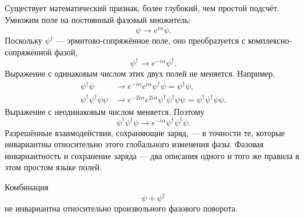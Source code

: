 Существует математический признак, более глубокий, чем простой подсчёт. Умножим поле на постоянный фазовый множитель:
\begin{equation}
\psi\longrightarrow e^{i\alpha}\psi.
\end{equation}
Поскольку \(\psi^\dagger\) — эрмитово-сопряжённое поле, оно преобразуется с комплексно-сопряжённой фазой,
\begin{equation}
\psi^\dagger\longrightarrow e^{-i\alpha}\psi^\dagger.
\end{equation}
Выражение с одинаковым числом этих двух полей не меняется. Например,
\begin{align}
\psi^\dagger\psi
&\longrightarrow
e^{-i\alpha}e^{i\alpha}\psi^\dagger\psi
=\psi^\dagger\psi,\\
\psi^\dagger\psi^\dagger\psi\psi
&\longrightarrow
e^{-2i\alpha}e^{2i\alpha}
\psi^\dagger\psi^\dagger\psi\psi
=\psi^\dagger\psi^\dagger\psi\psi.
\end{align}
Выражение с неодинаковым числом меняется. Поэтому
\begin{equation}
\psi^\dagger\psi^\dagger\psi
\longrightarrow
e^{-i\alpha}\psi^\dagger\psi^\dagger\psi.
\end{equation}
Разрешённые взаимодействия, сохраняющие заряд, — в точности те, которые инвариантны относительно этого глобального изменения фазы. Фазовая инвариантность и сохранение заряда — два описания одного и того же правила в этом простом языке полей.

Комбинация
\begin{equation}
\psi+\psi^\dagger
\end{equation}
не инвариантна относительно произвольного фазового поворота.

\begin{classroomqa}
\end{classroomqa}

\begin{classroomqa}
\end{classroomqa}

